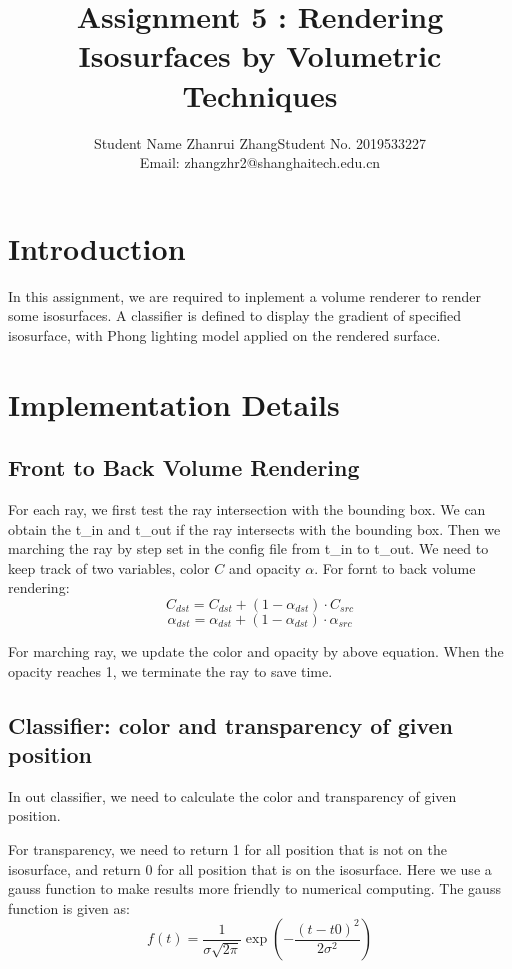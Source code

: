 \documentclass[acmtog]{acmart}
\title{Assignment 5 : Rendering Isosurfaces by Volumetric Techniques}
\author{Student Name Zhanrui Zhang\quad Student No. 2019533227 \\ Email: zhangzhr2@shanghaitech.edu.cn}
\begin{document}
\maketitle

\vspace*{2 ex}


\section{Introduction}

In this assignment, we are required to inplement a volume renderer to render some isosurfaces. A classifier is defined to display the gradient of specified isosurface, with Phong lighting model applied on the rendered surface.

\section{Implementation Details}

\subsection{Front to Back Volume Rendering}
For each ray, we first test the ray intersection with the bounding box. We can obtain the t\_in and t\_out if the ray intersects with the bounding box. Then we marching the ray by step set in the config file from t\_in to t\_out. We need to keep track of two variables, color $C$ and opacity $\alpha$. For fornt to back volume rendering: 
\[C_{dst} = C_{dst} + (1-\alpha_{dst}) \cdot C_{src}\]
\[\alpha_{dst} = \alpha_{dst} + (1-\alpha_{dst}) \cdot \alpha_{src}\]

For marching ray, we update the color and opacity by above equation. When the opacity reaches 1, we terminate the ray to save time.

\subsection{Classifier: color and transparency of given position}
In out classifier, we need to calculate the color and transparency of given position.

For transparency, we need to return 1 for all position that is not on the isosurface, and return 0 for all position that is on the isosurface. Here we use a gauss function to make results more friendly to numerical computing.
The gauss function is given as:
\[f(t) = \frac{1}{\sigma\sqrt{2\pi}}\exp(-\frac{(t-t0)^2}{2\sigma^2})\]
\end{document}
